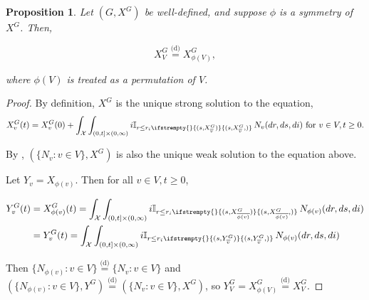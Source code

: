 \documentclass[12pt]{article}
\newcommand{\mb}{\mathbb}
\newcommand{\mc}{\mathcal}
\newcommand{\ov}{\overline}
\newcommand{\te}{\text}
\newcommand{\ind}{\hspace{24pt}}
\newcommand{\deq}{\overset{\text{(d)}}{=}}			%
\newcommand{\sta}{\mc{X}}							%
\newcommand{\cl}[1]{\ov{#1}}						%
\newcommand{\Xf}{X}									%
\newcommand{\poiss}{N}								%
\newcommand{\rate}{r}								%
\newcommand{\poissv}[1]{_{#1}}						%
\newcommand{\vind}[1]{_{#1}}						%
\newcommand{\tme}[1]{(#1)}							%
\newcommand{\gind}[1]{^{#1}}						%
\newcommand{\stpara}[1]{_{#1}}						%
\newcommand{\tmepro}[3]{
\ifstrempty{#3}{
	(#1,#2)}{
	(#1,#2,#3)}}									%
\newcommand{\Xg}{Y}									%
\newtheorem{prop}[thms]{Proposition}
\begin{document}
\begin{prop}
Let \((G,\Xf\gind{G})\) be well-defined, and suppose \(\phi\) is a symmetry of \(\Xf\gind{G}\). Then,

\[\Xf\gind{G}\vind{V} \deq \Xf\gind{G}\vind{\phi(V)},\]

where \(\phi(V)\) is treated as a permutation of \(V\).
\label{a::simprop}
\end{prop}
\begin{proof}
By definition, \(\Xf\gind{G}\) is the unique strong solution to the equation,
\[\Xf\gind{G}\vind{v}\tme{t} = \Xf\gind{G}\vind{v}\tme{0} + \int_\sta\int_{(0,t]\times(0,\infty)} i\mb{I}_{r \leq \rate\stpara{i}\tmepro{s}{\Xf\gind{G}\vind{\cl{v}}}{}}\,\poiss\poissv{v}(dr,ds,di) \te{ for } v \in V, t \geq 0.\]

By \cite[Proposition 2.10]{Kur07}, \((\{\poiss\poissv{v}:v\in V\},\Xf\gind{G})\) is also the unique weak solution to the equation above.

\ind Let \(\Xg\vind{v} = \Xf\vind{\phi(v)}\). Then for all \(v\in V,t\geq 0\),

\begin{align*}
\Xg\gind{G}\vind{v}\tme{t} &= \Xf\gind{G}\vind{\phi(v)}\tme{t} = \int_\sta\int_{(0,t]\times(0,\infty)} i\mb{I}_{r \leq \rate\stpara{i}\tmepro{s}{\Xf\gind{G}\vind{\cl{\phi(v)}}}{}}\,\poiss\poissv{\phi(v)}(dr,ds,di)\\
&= \Xg\gind{G}\vind{v}\tme{t} = \int_\sta\int_{(0,t]\times(0,\infty)} i\mb{I}_{r \leq \rate\stpara{i}\tmepro{s}{\Xg\gind{G}\vind{\cl{v}}}{}}\,\poiss\poissv{\phi(v)}(dr,ds,di)\\
\end{align*}

Then \(\{\poiss\poissv{\phi(v)}:v \in V\} \deq \{\poiss\poissv{v}:v\in V\}\) and \((\{\poiss\poissv{\phi(v)}:v \in V\},\Xg\gind{G}) \deq (\{\poiss\poissv{v}:v \in V\},\Xf\gind{G})\), so \(\Xg\gind{G}\vind{V} = \Xf\gind{G}\vind{\phi(V)} \deq \Xf\gind{G}\vind{V}\).
\end{proof}


%

%
\end{document}
